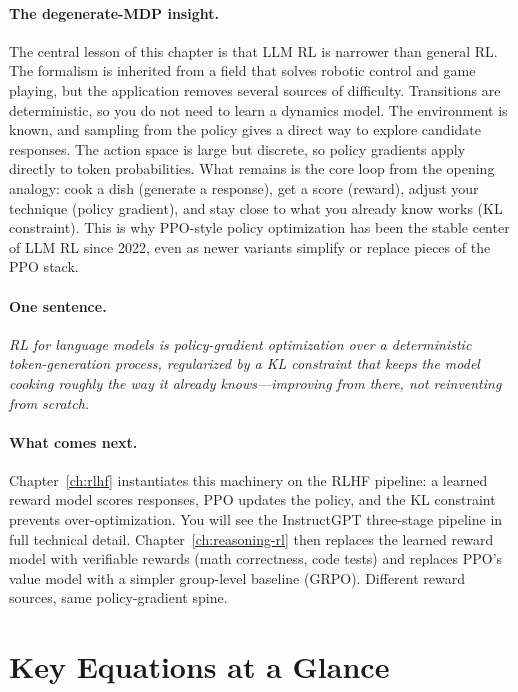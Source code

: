 \paragraph{The degenerate-MDP insight.} The central lesson of this chapter is that LLM RL is narrower than general RL. The formalism is inherited from a field that solves robotic control and game playing, but the application removes several sources of difficulty. Transitions are deterministic, so you do not need to learn a dynamics model. The environment is known, and sampling from the policy gives a direct way to explore candidate responses. The action space is large but discrete, so policy gradients apply directly to token probabilities. What remains is the core loop from the opening analogy: cook a dish (generate a response), get a score (reward), adjust your technique (policy gradient), and stay close to what you already know works (KL constraint). This is why PPO-style policy optimization has been the stable center of LLM RL since 2022, even as newer variants simplify or replace pieces of the PPO stack.

\paragraph{One sentence.} \emph{RL for language models is policy-gradient optimization over a deterministic token-generation process, regularized by a KL constraint that keeps the model cooking roughly the way it already knows---improving from there, not reinventing from scratch.}

\paragraph{What comes next.} Chapter~\ref{ch:rlhf} instantiates this machinery on the RLHF pipeline: a learned reward model scores responses, PPO updates the policy, and the KL constraint prevents over-optimization. You will see the InstructGPT three-stage pipeline in full technical detail. Chapter~\ref{ch:reasoning-rl} then replaces the learned reward model with verifiable rewards (math correctness, code tests) and replaces PPO's value model with a simpler group-level baseline (GRPO). Different reward sources, same policy-gradient spine.


\section*{Key Equations at a Glance}

